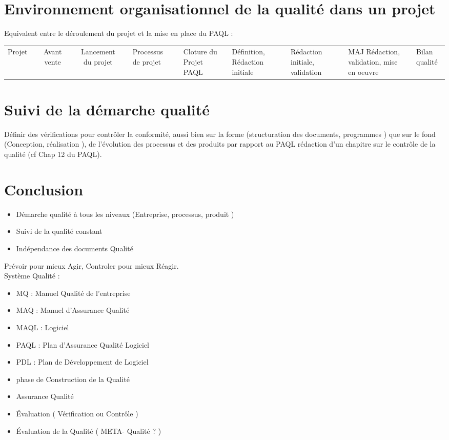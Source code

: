 \section{Environnement organisationnel de la qualité dans un projet}


Equivalent entre le déroulement du projet et la mise en place du PAQL :\\

\begin{tabular}{|c|c|c|c|c|}
\hline
Projet && Avant vente && Lancement du projet && Processus de projet && Cloture du Projet
\hline
PAQL && Définition, Rédaction initiale && Rédaction initiale, validation && MAJ Rédaction, validation, mise en oeuvre && Bilan qualité
\hline
\end{tabular}

\section{Suivi de la démarche qualité}

Définir des vérifications pour contrôler la conformité, aussi bien sur la forme (structuration des documents, programmes ) que sur le fond (Conception, réalisation ), de l’évolution des processus et des produits par rapport au PAQL \rightarrow rédaction d’un chapitre sur le contrôle de la qualité (cf Chap 12 du PAQL).

\section{Conclusion}

\begin{itemize}
\item Démarche qualité à tous les niveaux (Entreprise, processus, produit )
\item Suivi de la qualité constant
\item Indépendance des documents Qualité
\end{itemize}

Prévoir pour mieux Agir, Controler pour mieux Réagir.\\

Système Qualité :
\begin{itemize}
\item MQ : Manuel Qualité de l’entreprise
\item MAQ : Manuel d’Assurance Qualité  
\item MAQL :   			 	          Logiciel
\item PAQL : Plan d’Assurance Qualité Logiciel
\item PDL : Plan de Développement de Logiciel 
\item phase de Construction de la Qualité
\item Assurance Qualité
\item Évaluation ( Vérification ou Contrôle )
\item Évaluation de la Qualité ( META- Qualité ? )
\end{itemize}

